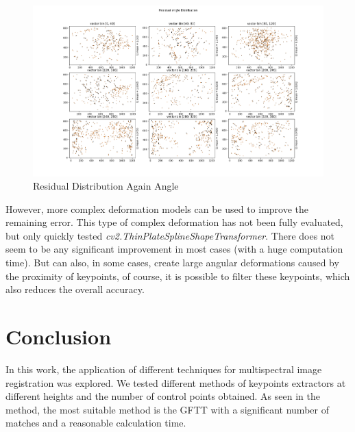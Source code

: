 \documentclass[]{elsarticle}
\begin{document}
	\begin{figure}[!htb]
		\centering
		\includegraphics[width=\linewidth]{../figures/perspective-features-residual.png}
		\caption{Residual Distribution Again Angle}
		\label{fig:residual-angle}
	\end{figure}
	
	\par However, more complex deformation models \cite{Lombaert, ThinPlateSpline} can be used to improve the remaining error.
	This type of complex deformation has not been fully evaluated, but only quickly tested \textit{cv2.ThinPlateSplineShapeTransformer}.
	There does not seem to be any significant improvement in most cases (with a huge computation time).
	But can also, in some cases, create large angular deformations caused by the proximity of keypoints,
	of course, it is possible to filter these keypoints, which also reduces the overall accuracy.
	
	
	\section{Conclusion}
	
	In this work, the application of different techniques for multispectral image registration was explored.
	We tested different methods of keypoints extractors at different heights and the number of control points obtained.
	As seen in the method, the most suitable method is the GFTT with a significant number of matches and a reasonable calculation time.
	
\end{document}
